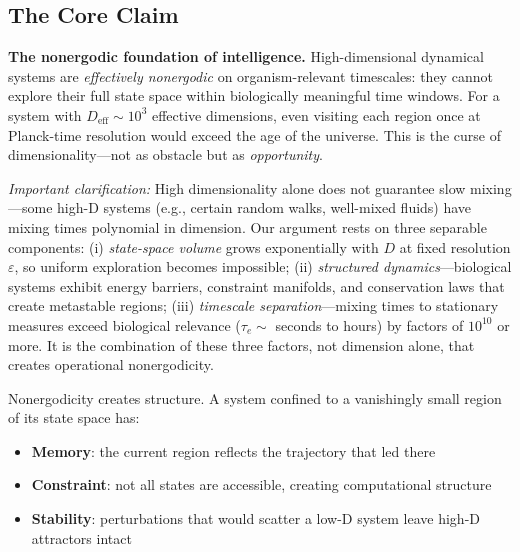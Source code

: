 \documentclass[12pt]{article}
\begin{document}
\subsection{The Core Claim}

\textbf{The nonergodic foundation of intelligence.} High-dimensional dynamical systems are \textit{effectively nonergodic} on organism-relevant timescales: they cannot explore their full state space within biologically meaningful time windows. For a system with $D_{\text{eff}} \sim 10^3$ effective dimensions, even visiting each region once at Planck-time resolution would exceed the age of the universe. This is the curse of dimensionality---not as obstacle but as \textit{opportunity}.

\medskip
\noindent{}

\textit{Important clarification:} High dimensionality alone does not guarantee slow mixing---some high-D systems (e.g., certain random walks, well-mixed fluids) have mixing times polynomial in dimension. Our argument rests on three separable components: (i) \textit{state-space volume} grows exponentially with $D$ at fixed resolution $\varepsilon$, so uniform exploration becomes impossible; (ii) \textit{structured dynamics}---biological systems exhibit energy barriers, constraint manifolds, and conservation laws that create metastable regions; (iii) \textit{timescale separation}---mixing times to stationary measures exceed biological relevance ($\tau_e \sim$ seconds to hours) by factors of $10^{10}$ or more. It is the combination of these three factors, not dimension alone, that creates operational nonergodicity.

Nonergodicity creates structure. A system confined to a vanishingly small region of its state space has:
\begin{itemize}
\item \textbf{Memory}: the current region reflects the trajectory that led there
\item \textbf{Constraint}: not all states are accessible, creating computational structure
\item \textbf{Stability}: perturbations that would scatter a low-D system leave high-D attractors intact
\end{itemize}
\end{document}
